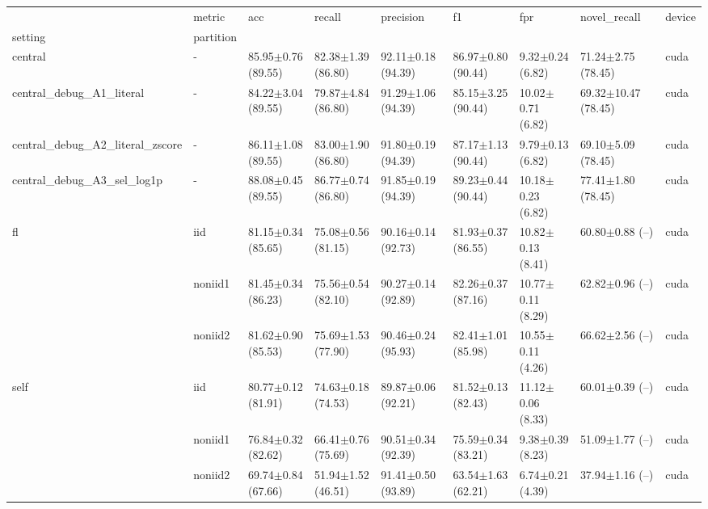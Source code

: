 \begin{tabular}{lllllllll}
\toprule
 & metric & acc & recall & precision & f1 & fpr & novel_recall & device \\
setting & partition &  &  &  &  &  &  &  \\
\midrule
central & - & 85.95$\pm$0.76 (89.55) & 82.38$\pm$1.39 (86.80) & 92.11$\pm$0.18 (94.39) & 86.97$\pm$0.80 (90.44) & 9.32$\pm$0.24 (6.82) & 71.24$\pm$2.75 (78.45) & cuda \\
\cline{1-9}
central_debug_A1_literal & - & 84.22$\pm$3.04 (89.55) & 79.87$\pm$4.84 (86.80) & 91.29$\pm$1.06 (94.39) & 85.15$\pm$3.25 (90.44) & 10.02$\pm$0.71 (6.82) & 69.32$\pm$10.47 (78.45) & cuda \\
\cline{1-9}
central_debug_A2_literal_zscore & - & 86.11$\pm$1.08 (89.55) & 83.00$\pm$1.90 (86.80) & 91.80$\pm$0.19 (94.39) & 87.17$\pm$1.13 (90.44) & 9.79$\pm$0.13 (6.82) & 69.10$\pm$5.09 (78.45) & cuda \\
\cline{1-9}
central_debug_A3_sel_log1p & - & 88.08$\pm$0.45 (89.55) & 86.77$\pm$0.74 (86.80) & 91.85$\pm$0.19 (94.39) & 89.23$\pm$0.44 (90.44) & 10.18$\pm$0.23 (6.82) & 77.41$\pm$1.80 (78.45) & cuda \\
\cline{1-9}
\multirow[t]{3}{*}{fl} & iid & 81.15$\pm$0.34 (85.65) & 75.08$\pm$0.56 (81.15) & 90.16$\pm$0.14 (92.73) & 81.93$\pm$0.37 (86.55) & 10.82$\pm$0.13 (8.41) & 60.80$\pm$0.88 (--) & cuda \\
 & noniid1 & 81.45$\pm$0.34 (86.23) & 75.56$\pm$0.54 (82.10) & 90.27$\pm$0.14 (92.89) & 82.26$\pm$0.37 (87.16) & 10.77$\pm$0.11 (8.29) & 62.82$\pm$0.96 (--) & cuda \\
 & noniid2 & 81.62$\pm$0.90 (85.53) & 75.69$\pm$1.53 (77.90) & 90.46$\pm$0.24 (95.93) & 82.41$\pm$1.01 (85.98) & 10.55$\pm$0.11 (4.26) & 66.62$\pm$2.56 (--) & cuda \\
\cline{1-9}
\multirow[t]{3}{*}{self} & iid & 80.77$\pm$0.12 (81.91) & 74.63$\pm$0.18 (74.53) & 89.87$\pm$0.06 (92.21) & 81.52$\pm$0.13 (82.43) & 11.12$\pm$0.06 (8.33) & 60.01$\pm$0.39 (--) & cuda \\
 & noniid1 & 76.84$\pm$0.32 (82.62) & 66.41$\pm$0.76 (75.69) & 90.51$\pm$0.34 (92.39) & 75.59$\pm$0.34 (83.21) & 9.38$\pm$0.39 (8.23) & 51.09$\pm$1.77 (--) & cuda \\
 & noniid2 & 69.74$\pm$0.84 (67.66) & 51.94$\pm$1.52 (46.51) & 91.41$\pm$0.50 (93.89) & 63.54$\pm$1.63 (62.21) & 6.74$\pm$0.21 (4.39) & 37.94$\pm$1.16 (--) & cuda \\
\cline{1-9}
\bottomrule
\end{tabular}
